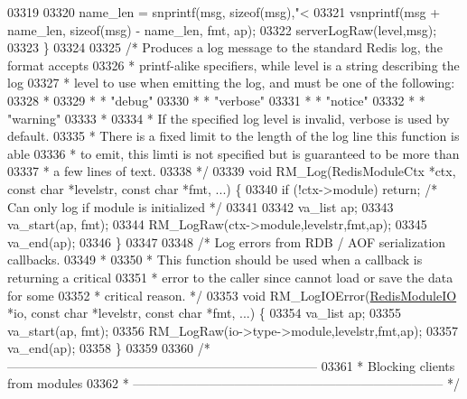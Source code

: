 \begin{DoxyCode}
{{{{{{{{{03319 
03320     name\_len = snprintf(msg, \textcolor{keyword}{sizeof}(msg),\textcolor{stringliteral}{"<%
03321     vsnprintf(msg + name\_len, \textcolor{keyword}{sizeof}(msg) - name\_len, fmt, ap);
03322     serverLogRaw(level,msg);
03323 \}
03324 
03325 \textcolor{comment}{/* Produces a log message to the standard Redis log, the format accepts}
03326 \textcolor{comment}{ * printf-alike specifiers, while level is a string describing the log}
03327 \textcolor{comment}{ * level to use when emitting the log, and must be one of the following:}
03328 \textcolor{comment}{ *}
03329 \textcolor{comment}{ * * "debug"}
03330 \textcolor{comment}{ * * "verbose"}
03331 \textcolor{comment}{ * * "notice"}
03332 \textcolor{comment}{ * * "warning"}
03333 \textcolor{comment}{ *}
03334 \textcolor{comment}{ * If the specified log level is invalid, verbose is used by default.}
03335 \textcolor{comment}{ * There is a fixed limit to the length of the log line this function is able}
03336 \textcolor{comment}{ * to emit, this limti is not specified but is guaranteed to be more than}
03337 \textcolor{comment}{ * a few lines of text.}
03338 \textcolor{comment}{ */}
03339 \textcolor{keywordtype}{void} RM\_Log(RedisModuleCtx *ctx, \textcolor{keyword}{const} \textcolor{keywordtype}{char} *levelstr, \textcolor{keyword}{const} \textcolor{keywordtype}{char} *fmt, ...) \{
03340     \textcolor{keywordflow}{if} (!ctx->module) \textcolor{keywordflow}{return};   \textcolor{comment}{/* Can only log if module is initialized */}
03341 
03342     va\_list ap;
03343     va\_start(ap, fmt);
03344     RM\_LogRaw(ctx->module,levelstr,fmt,ap);
03345     va\_end(ap);
03346 \}
03347 
03348 \textcolor{comment}{/* Log errors from RDB / AOF serialization callbacks.}
03349 \textcolor{comment}{ *}
03350 \textcolor{comment}{ * This function should be used when a callback is returning a critical}
03351 \textcolor{comment}{ * error to the caller since cannot load or save the data for some}
03352 \textcolor{comment}{ * critical reason. */}
03353 \textcolor{keywordtype}{void} RM\_LogIOError(\hyperlink{structRedisModuleIO}{RedisModuleIO} *io, \textcolor{keyword}{const} \textcolor{keywordtype}{char} *levelstr, \textcolor{keyword}{const} \textcolor{keywordtype}{char} *fmt, ...) \{
03354     va\_list ap;
03355     va\_start(ap, fmt);
03356     RM\_LogRaw(io->type->module,levelstr,fmt,ap);
03357     va\_end(ap);
03358 \}
03359 
03360 \textcolor{comment}{/* --------------------------------------------------------------------------}
03361 \textcolor{comment}{ * Blocking clients from modules}
03362 \textcolor{comment}{ * -------------------------------------------------------------------------- */}
}}}}}}}}}}
\end{DoxyCode}

